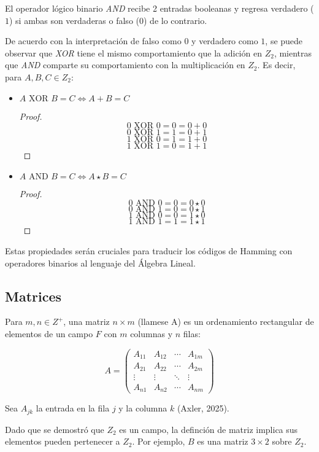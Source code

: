 \documentclass{article}
\begin{document}
El operador lógico binario \textit{AND} recibe 2 entradas booleanas y regresa verdadero ($1$) si ambas son verdaderas o falso ($0$) de lo contrario.

De acuerdo con la interpretación de falso como $0$ y verdadero como $1$, se puede observar que \textit{XOR} tiene el mismo comportamiento que la adición en $Z_2$, mientras que \textit{AND} comparte su comportamiento con la multiplicación en $Z_2$. Es decir, para $A, B, C \in Z_2$:

\begin{itemize}
    \item $A \text{ XOR } B = C \iff A + B = C$
    \begin{proof}
        $$0 \text{ XOR } 0 = 0 = 0 + 0$$
        $$0 \text{ XOR } 1 = 1 = 0 + 1$$
        $$1 \text{ XOR } 0 = 1 = 1 + 0$$
        $$1 \text{ XOR } 1 = 0 = 1 + 1$$
    \end{proof}
    \item $A \text{ AND } B = C \iff A \star B = C$
    \begin{proof}
        $$0 \text{ AND } 0 = 0 = 0 \star 0$$
        $$0 \text{ AND } 1 = 0 = 0 \star 1$$
        $$1 \text{ AND } 0 = 0 = 1 \star 0$$
        $$1 \text{ AND } 1 = 1 = 1 \star 1$$
    \end{proof}
\end{itemize}

Estas propiedades serán cruciales para traducir los códigos de Hamming con operadores binarios al lenguaje del Álgebra Lineal. 

\subsection{Matrices}

Para $m, n \in Z^+$, una matriz $n \times m$ (llamese A) es un ordenamiento rectangular de elementos de un campo $F$ con $m$ columnas y $n$ filas:

$$
A = \begin{pmatrix}
    A_{11} & A_{12} & \cdots & A_{1m} \\
    A_{21} & A_{22} & \cdots & A_{2m} \\
    \vdots & \vdots & \ddots & \vdots \\
    A_{n1} & A_{n2} & \cdots & A_{nm}
\end{pmatrix}
$$

Sea $A_{jk}$ la entrada en la fila $j$ y la columna $k$ (Axler, 2025).

Dado que se demostró que $Z_2$ es un campo, la definción de matriz implica sus elementos pueden pertenecer a $Z_2$. Por ejemplo, $B$ es una matriz $ 3 \times 2 $ sobre $ Z_2 $.
\end{document}
